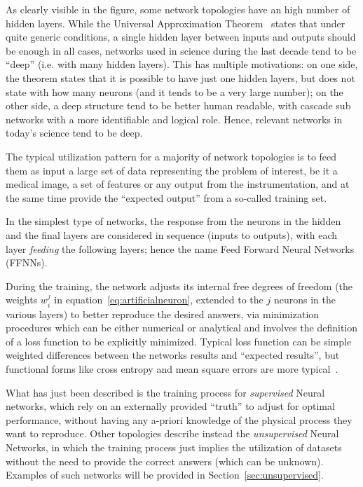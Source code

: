 As clearly visible in the figure, some network topologies have an high number of hidden layers. While the Universal Approximation Theorem~\cite{nonlinearitytheorem} states that under quite generic conditions, a single hidden layer between inputs and outputs should be enough in all cases, networks used in science during the last decade tend to be ``deep'' (i.e. with many hidden layers). This has multiple motivations: on one side, the theorem states that it is possible to have just one hidden layers, but does not state with how many neurons (and it tends to be a very large number); on the other side, a deep structure tend to be better human readable, with cascade sub networks with a more identifiable and logical role. Hence, relevant networks in today's science tend to be deep.


The typical utilization pattern for a majority of network topologies is to feed them as input a large set of data representing the problem of interest, be it a medical image, a set of features or any output from the instrumentation, and at the same time provide the ``expected output''
from a so-called training set. 

In the simplest type of networks, the response from the neurons in the hidden and the final layers are considered in sequence (inputs to outputs), with each layer \emph{feeding} the following layers; hence the name Feed Forward Neural Networks (FFNNs).

During the training, the network adjusts its internal free degrees of freedom (the weights $w_i^j$ in equation~\ref{eq:artificialneuron}, extended to the $j$ neurons in the various layers) to better reproduce the desired answers, via minimization procedures which can be either numerical or analytical and involves the definition of a loss function to be explicitly minimized. Typical loss function can be simple weighted differences between the networks results and ``expected results'', but functional forms like cross entropy and mean square errors are more typical~\cite{lossfunctions}.

What has just been described is the training process for \emph{supervised} Neural networks, which rely on an externally provided ``truth'' to adjust for optimal performance, without having any a-priori knowledge of the physical process they want to reproduce.
Other topologies describe instead the \emph{unsupervised} Neural Networks, in which the training process just implies the utilization of datasets without the need to provide the correct answers (which can be unknown). Examples of such networks will be provided in Section~\ref{sec:unsupervised}.

